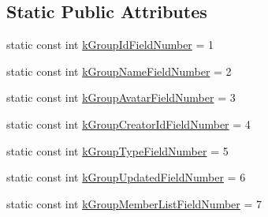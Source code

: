 \subsection*{Static Public Attributes}
\begin{DoxyCompactItemize}
\item 
static const int \hyperlink{class_i_m_1_1_base_define_1_1_client_group_info_ac1d5dd7a63b04720897836302136fd40}{k\+Group\+Id\+Field\+Number} = 1
\item 
static const int \hyperlink{class_i_m_1_1_base_define_1_1_client_group_info_aacaea65b3247d389237b979ef89ce0d7}{k\+Group\+Name\+Field\+Number} = 2
\item 
static const int \hyperlink{class_i_m_1_1_base_define_1_1_client_group_info_a7e1d01a95fddf07536a4be46c3ed7052}{k\+Group\+Avatar\+Field\+Number} = 3
\item 
static const int \hyperlink{class_i_m_1_1_base_define_1_1_client_group_info_af0dea5789f465a43c575908db4f128c6}{k\+Group\+Creator\+Id\+Field\+Number} = 4
\item 
static const int \hyperlink{class_i_m_1_1_base_define_1_1_client_group_info_ab28cd9dba0736b1064d85e3bbc4c55b6}{k\+Group\+Type\+Field\+Number} = 5
\item 
static const int \hyperlink{class_i_m_1_1_base_define_1_1_client_group_info_a906f2b869704ec81c62b5d58206c412b}{k\+Group\+Updated\+Field\+Number} = 6
\item 
static const int \hyperlink{class_i_m_1_1_base_define_1_1_client_group_info_a7f3d68c550c52686888e20b213c5b903}{k\+Group\+Member\+List\+Field\+Number} = 7
\end{DoxyCompactItemize}
